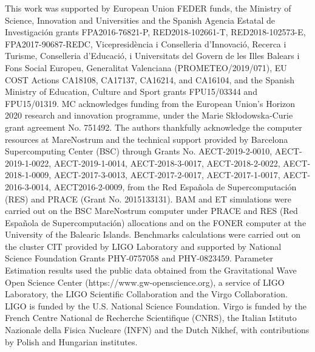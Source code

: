 \documentclass[twocolumn,prd,aps,superscriptaddress,preprintnumbers,tightenlines,showpacs,nofootinbib,eqsecnum,amsfonts,amsmath]{revtex4}
\begin{document}
This work was supported by European Union FEDER funds, the Ministry of Science, 
Innovation and Universities and the Spanish Agencia Estatal de Investigaci{\'o}n grants FPA2016-76821-P,        %
RED2018-102661-T,    %
RED2018-102573-E,    %
FPA2017-90687-REDC,  %
%
Vicepresidència i Conselleria d’Innovació, Recerca i Turisme, Conselleria d’Educació, i Universitats del Govern de les Illes Balears i Fons Social Europeu, 
%
Generalitat Valenciana (PROMETEO/2019/071),  
%
EU COST Actions CA18108, CA17137, CA16214, and CA16104, and
the Spanish Ministry of Education, Culture and Sport grants FPU15/03344 and FPU15/01319.
%
MC acknowledges funding from the European Union's Horizon 2020 research and innovation programme, under the Marie Skłodowska-Curie grant agreement No. 751492.
%
The authors thankfully acknowledge the computer resources at MareNostrum and the technical support provided by Barcelona Supercomputing Center (BSC) through Grants No. AECT-2019-2-0010, AECT-2019-1-0022, AECT-2019-1-0014, AECT-2018-3-0017, AECT-2018-2-0022, AECT-2018-1-0009, AECT-2017-3-0013, AECT-2017-2-0017, AECT-2017-1-0017, AECT-2016-3-0014, AECT2016-2-0009,  from the Red Española de Supercomputación (RES) and PRACE (Grant No. 2015133131). BAM and ET simulations were carried out on the BSC MareNostrum computer under PRACE and RES (Red Española de Supercomputación) allocations and on the FONER computer at the University of the Balearic Islands. 
%
Benchmarks calculations were carried out on the cluster CIT provided by LIGO Laboratory and supported by National Science Foundation Grants PHY-0757058 and PHY-0823459. Parameter Estimation results used the public data obtained from the Gravitational Wave Open Science Center (https://www.gw-openscience.org), a service of LIGO Laboratory, the LIGO Scientific Collaboration and the Virgo Collaboration. LIGO is funded by the U.S. National Science Foundation. Virgo is funded by the French Centre National de Recherche Scientifique (CNRS), the Italian Istituto Nazionale della Fisica Nucleare (INFN) and the Dutch Nikhef, with contributions by Polish and Hungarian institutes.




\appendix
\end{document}
